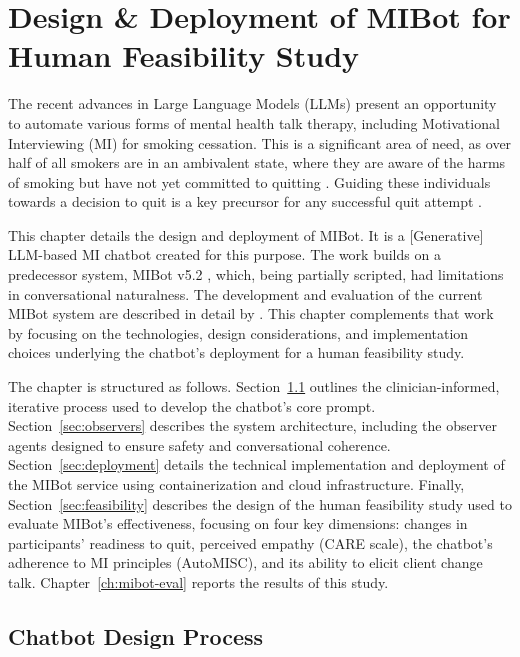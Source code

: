 \chapter{Design \& Deployment of MIBot for Human Feasibility Study}
\label{ch:mibot}

The recent advances in Large Language Models (LLMs) present an opportunity to automate various forms of mental health talk therapy, including Motivational Interviewing (MI) for smoking cessation. This is a significant area of need, as over half of all smokers are in an ambivalent state, where they are aware of the harms of smoking but have not yet committed to quitting \citep{Babb2017}. Guiding these individuals towards a decision to quit is a key precursor for any successful quit attempt \citep{West2006}.

This chapter details the design and deployment of MIBot. It is a [Generative] LLM-based MI chatbot created for this purpose. The work builds on a predecessor system, MIBot v5.2 \citep{info:doi/10.2196/49132}, which, being partially scripted, had limitations in conversational naturalness. The development and evaluation of the current MIBot system are described in detail by \citet{mahmood-etal-2025-fully}. This chapter complements that work by focusing on the technologies, design considerations, and implementation choices underlying the chatbot's deployment for a human feasibility study.

The chapter is structured as follows. Section~\ref{sec:iterative-development} outlines the clinician-informed, iterative process used to develop the chatbot's core prompt. Section~\ref{sec:observers} describes the system architecture, including the observer agents designed to ensure safety and conversational coherence. Section~\ref{sec:deployment} details the technical implementation and deployment of the MIBot service using containerization and cloud infrastructure. Finally, Section~\ref{sec:feasibility} describes the design of the human feasibility study used to evaluate MIBot's effectiveness, focusing on four key dimensions: changes in participants' readiness to quit, perceived empathy (CARE scale), the chatbot's adherence to MI principles (AutoMISC), and its ability to elicit client change talk. Chapter~\ref{ch:mibot-eval} reports the results of this study.




\section{Chatbot Design Process}
\label{sec:iterative-development}

